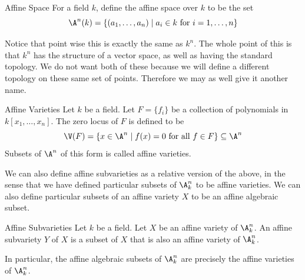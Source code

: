 \documentclass[a4paper]{article}
\begin{document}
\begin{defn}{Affine Space}{} For a field $k$, define the affine space over $k$ to be the set $$\A^n(k)=\{(a_1,\dots,a_n)\;|\;a_i\in k\text{ for }i=1,\dots,n\}$$
\end{defn}

Notice that point wise this is exactly the same as $k^n$. The whole point of this is that $k^n$ has the structure of a vector space, as well as having the standard topology. We do not want both of these because we will define a different topology on these same set of points. Therefore we may as well give it another name. 

\begin{defn}{Affine Varieties}{} Let $k$ be a field. Let $F=\{f_i\}$ be a collection of polynomials in $k[x_1,\dots,x_n]$. The zero locus of $F$ is defined to be $$\V(F)=\{x\in\A^n\;|\;f(x)=0\text{ for all }f\in F\}\subseteq\A^n$$ Subsets of $\A^n$ of this form is called affine varieties. 
\end{defn}

We can also define affine subvarieties as a relative version of the above, in the sense that we have defined particular subsets of $\A_k^n$ to be affine varieties. We can also define particular subsets of an affine variety $X$ to be an affine algebraic subset. 

\begin{defn}{Affine Subvarieties}{} Let $k$ be a field. Let $X$ be an affine variety of $\A_k^n$. An affine subvariety $Y$ of $X$ is a subset of $X$ that is also an affine variety of $\A_k^n$. 
\end{defn}

In particular, the affine algebraic subsets of $\A_k^n$ are precisely the affine varieties of $\A_k^n$. 
\end{document}
